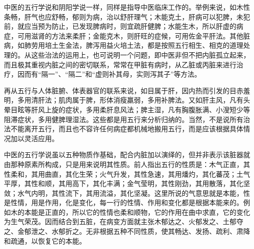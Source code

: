 \documentclass[12pt,UTF8]{ctexbook}
\begin{document}
\begin{table}\centering
{}
\end{table}

中医的五行学说和阴阳学说一样，同样是指导中医临床工作的。举例来说，如木性条畅，肝气也应舒畅，郁则为病，治以舒肝理气；木能克土，肝病可以犯脾，未犯前，就应当预为防止，已发现脾病时，则宜疏肝健脾；水能生木，所以肝虚的病症，可用滋肾的方法来柔肝；金能克木，则肝旺的症候，可用佐金平肝法。其他脏病，如肺劳用培土生金法，脾泻用益火培土法，都是按照五行相生、相克的道理处理的。从这些治法的运用上，也可说明一个问题，即中医非但不把内脏孤立起来，而且极其重视内脏之间的密切联系，常常在甲脏有病时，从乙脏或丙脏来进行治疗，因而有“隔一”、“隔二”和“虚则补其母，实则泻其子”等方法。

再从五行与人体脏腑、体表器官的联系来说，如目属于肝，因内热而引发的目赤羞明，多用清肝法；肌肉属于脾，形体消瘦羸弱，多用补脾法。又如肝主风，凡有头晕目眩等肝风上旋的症状，多用柔肝息风法；脾主湿，凡有胸腹胀满、小溲短少等阻滞症状，多用健脾理湿法。这些都是用五行来分析归纳的。当然，不是说所有治法不能离开五行，而且也不容许任何病症都机械地搬用五行，而是应该根据具体情况加以灵活应用。

中医的五行学说虽以五种物质作基础，配合内脏加以演绎的，但并非表示该脏器就由那种原素所构成，只是用来说明其性质。前人指出五行的性质是：木气正直，其性柔和，其用曲直，其化生荣；火气升发，其性急速，其用燔灼，其化蕃茂；土气平厚，其性和顺，其用高下，其化丰满；金气莹明，其性刚劲，其用散落，其化坚敛；水气内明，其性流下，其用流溢，其化坚凝。这里所说的气意思就是本能，性是性情，用是作用，化是变化，每一行的性情、作用和变化都是根据本能来的。例如木的本能是正直的，所以它的性情也柔和顺物，它的作用在曲中求直，它的变化为生气荣茂。因而结合到五脏，在病变方面就主张木郁达之、火郁发之、土郁夺之、金郁泄之、水郁折之。无非根据五种不同性质，使其畅达、发扬、疏利、肃降和疏通，以恢复它的本能。
\end{document}
